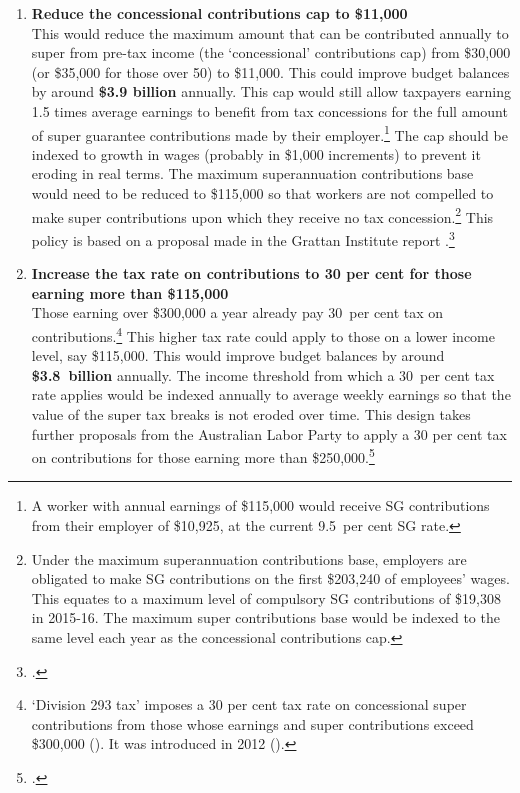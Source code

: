\DEVIATION{}
\begin{enumerate}
\item 
{\textbf{Reduce the concessional contributions cap to \$11,000}}\\
This would reduce the maximum amount that can be contributed annually to super from pre-tax income (the ‘concessional’ contributions cap) from \$30,000 (or \$35,000 for those over 50) to \$11,000. This could improve budget balances by around \textbf{\$3.9 billion} annually. This cap would still allow taxpayers earning 1.5 times average earnings to benefit from tax concessions for the full amount of super guarantee contributions made by their employer.\footnote{A worker with annual earnings of \$115,000 would receive SG contributions from their employer of \$10,925, at the current 9.5~per cent SG rate.}  The cap should be indexed to growth in wages (probably in \$1,000 increments) to prevent it eroding in real terms. The maximum superannuation contributions base would need to be reduced to \$115,000 so that workers are not compelled to make super contributions upon which they receive no tax concession.\footnote{Under the maximum superannuation contributions base, employers are obligated to make SG contributions on the first \$203,240 of employees’ wages. This equates to a maximum level of compulsory SG contributions of \$19,308 in 2015-16. The maximum super contributions base would be indexed to the same level each year as the concessional contributions cap.}  This policy is based on a proposal made in the Grattan Institute report .\footcite[][32]{DaleyMcGannonSavageEtAl2013BalancingBudgets} 

\item 
{\textbf{Increase the tax rate on contributions to 30 per cent for those earning more than \$115,000}}\\
Those earning over \$300,000 a year already pay 30~per cent tax on contributions.\footnote{‘Division 293 tax’ imposes a 30 per cent tax rate on concessional super contributions from those whose earnings and super contributions exceed \$300,000 (\textcite{ATO2015HowisDiv293calculated}). It was introduced in 2012 (\textcite{Shorten2012}).}  This higher tax rate could apply to those on a lower income level, say \$115,000. This would improve budget balances by around \textbf{\$3.8~billion} annually.%
 The income threshold from which a 30~per cent tax rate applies would be indexed annually to average weekly earnings so that the value of the super tax breaks is not eroded over time. This design takes further proposals from the Australian Labor Party to apply a 30 per cent tax on contributions for those earning more than \$250,000.\footcite{ALP2015FairerSuper}  


\end{enumerate}
